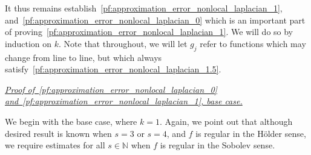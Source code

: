 It thus remains establish~\eqref{pf:approximation_error_nonlocal_laplacian_1}, and~\eqref{pf:approximation_error_nonlocal_laplacian_0} which is an important part of proving~\eqref{pf:approximation_error_nonlocal_laplacian_1}. We will do so by induction on $k$. Note that throughout, we will let $g_j$ refer to functions which may change from line to line, but which always satisfy~\eqref{pf:approximation_error_nonlocal_laplacian_1.5}. 

\underline{\textit{Proof of~\eqref{pf:approximation_error_nonlocal_laplacian_0} and~\eqref{pf:approximation_error_nonlocal_laplacian_1}, base case.}}

We begin with the base case, where $k = 1$. Again, we point out that although desired result is known when $s = 3$ or $s = 4$, and $f$ is regular in the H\"{o}lder sense, we require estimates for all $s \in \mathbb{N}$ when $f$ is regular in the Sobolev sense.

